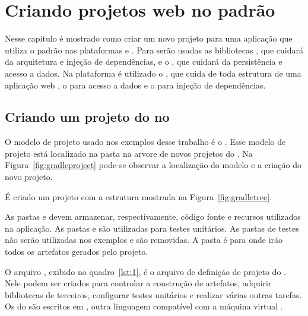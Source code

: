 \chapter{Criando projetos web no padrão }

Nesse capitulo é mostrado como criar um novo projeto para uma aplicação  que utiliza o padrão  nas plataformas \spring e \anmvc. Para  serão usadas as bibliotecas , que cuidará da arquitetura  e injeção de dependências, e o , que cuidará da persistência e acesso a dados. Na plataforma  é utilizado o , que cuida de toda estrutura de uma aplicação web , o  para acesso a dados e o  para injeção de dependências.

\section{Criando um projeto do  no }

O modelo de projeto usado nos exemplos desse trabalho é o . Esse modelo de projeto está localizado na pasta  na arvore de novos projetos do . Na Figura~\ref{fig:gradleproject} pode-se observar a localização do modelo e a criação do novo projeto.


É criado um projeto com a estrutura mostrada na Figura~\ref{fig:gradletree}.


As pastas  e  devem armazenar, respectivamente, código fonte  e recursos utilizados na aplicação.  As pastas  e  são utilizadas para testes unitários. As pastas de testes não serão utilizadas nos exemplos e são removidas. A pasta  é para onde irão todos os artefatos gerados pelo projeto.

O arquivo , exibido no quadro~\ref{lst:1}, é o arquivo de definição de projeto do . Nele podem ser criados  para controlar a construção de artefatos, adquirir bibliotecas de terceiros, configurar testes unitários e realizar várias outras tarefas. Os  do  são escritos em , outra linguagem compatível com a máquina virtual . 


